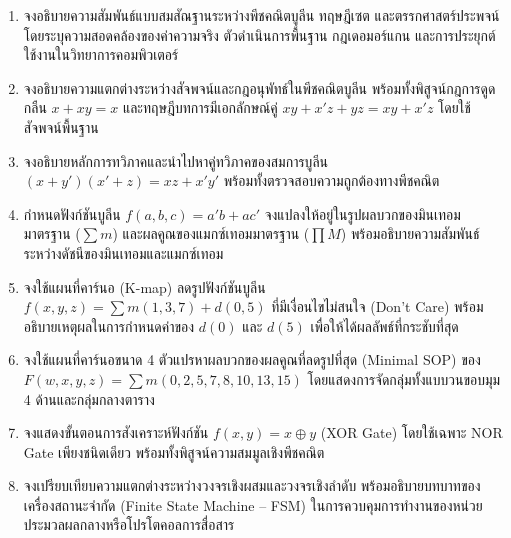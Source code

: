\newpage
\QAChapter
\begin{enumerate}
    \item จงอธิบายความสัมพันธ์แบบสมสัณฐานระหว่างพีชคณิตบูลีน ทฤษฎีเซต และตรรกศาสตร์ประพจน์ โดยระบุความสอดคล้องของค่าความจริง ตัวดำเนินการพื้นฐาน กฎเดอมอร์แกน และการประยุกต์ใช้งานในวิทยาการคอมพิวเตอร์

    \item จงอธิบายความแตกต่างระหว่างสัจพจน์และกฎอนุพัทธ์ในพีชคณิตบูลีน พร้อมทั้งพิสูจน์กฎการดูดกลืน $x + xy = x$ และทฤษฎีบทการมีเอกลักษณ์คู่ $xy + x'z + yz = xy + x'z$ โดยใช้สัจพจน์พื้นฐาน

    \item จงอธิบายหลักการทวิภาคและนำไปหาคู่ทวิภาคของสมการบูลีน $(x + y')(x' + z) = xz + x'y'$ พร้อมทั้งตรวจสอบความถูกต้องทางพีชคณิต

    \item กำหนดฟังก์ชันบูลีน $f(a, b, c) = a'b + ac'$ จงแปลงให้อยู่ในรูปผลบวกของมินเทอมมาตรฐาน ($\sum m$) และผลคูณของแมกซ์เทอมมาตรฐาน ($\prod M$) พร้อมอธิบายความสัมพันธ์ระหว่างดัชนีของมินเทอมและแมกซ์เทอม

    \item จงใช้แผนที่คาร์นอ (K-map) ลดรูปฟังก์ชันบูลีน $f(x, y, z) = \sum m(1, 3, 7) + d(0, 5)$ ที่มีเงื่อนไขไม่สนใจ (Don't Care) พร้อมอธิบายเหตุผลในการกำหนดค่าของ $d(0)$ และ $d(5)$ เพื่อให้ได้ผลลัพธ์ที่กระชับที่สุด

    \item จงใช้แผนที่คาร์นอขนาด 4 ตัวแปรหาผลบวกของผลคูณที่ลดรูปที่สุด (Minimal SOP) ของ $F(w, x, y, z) = \sum m(0, 2, 5, 7, 8, 10, 13, 15)$ โดยแสดงการจัดกลุ่มทั้งแบบวนขอบมุม 4 ด้านและกลุ่มกลางตาราง

    \item จงแสดงขั้นตอนการสังเคราะห์ฟังก์ชัน $f(x, y) = x \oplus y$ (XOR Gate) โดยใช้เฉพาะ NOR Gate เพียงชนิดเดียว พร้อมทั้งพิสูจน์ความสมมูลเชิงพีชคณิต

    \item จงเปรียบเทียบความแตกต่างระหว่างวงจรเชิงผสมและวงจรเชิงลำดับ พร้อมอธิบายบทบาทของเครื่องสถานะจำกัด (Finite State Machine -- FSM) ในการควบคุมการทำงานของหน่วยประมวลผลกลางหรือโปรโตคอลการสื่อสาร
\end{enumerate}

